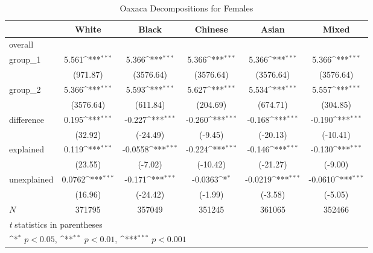 \begin{table}[htbp]\centering
\def\sym#1{\ifmmode^{#1}\else\(^{#1}\)\fi}
\caption{Oaxaca Decompositions for Females\label{tab1}}
\begin{tabular}{l*{5}{c}}
\hline\hline
            &\multicolumn{1}{c}{White}&\multicolumn{1}{c}{Black}&\multicolumn{1}{c}{Chinese}&\multicolumn{1}{c}{Asian}&\multicolumn{1}{c}{Mixed}\\
\hline
overall     &                     &                     &                     &                     &                     \\
group\_1     &       5.561\sym{***}&       5.366\sym{***}&       5.366\sym{***}&       5.366\sym{***}&       5.366\sym{***}\\
            &    (971.87)         &   (3576.64)         &   (3576.64)         &   (3576.64)         &   (3576.64)         \\
group\_2     &       5.366\sym{***}&       5.593\sym{***}&       5.627\sym{***}&       5.534\sym{***}&       5.557\sym{***}\\
            &   (3576.64)         &    (611.84)         &    (204.69)         &    (674.71)         &    (304.85)         \\
difference  &       0.195\sym{***}&      -0.227\sym{***}&      -0.260\sym{***}&      -0.168\sym{***}&      -0.190\sym{***}\\
            &     (32.92)         &    (-24.49)         &     (-9.45)         &    (-20.13)         &    (-10.41)         \\
explained   &       0.119\sym{***}&     -0.0558\sym{***}&      -0.224\sym{***}&      -0.146\sym{***}&      -0.130\sym{***}\\
            &     (23.55)         &     (-7.02)         &    (-10.42)         &    (-21.27)         &     (-9.00)         \\
unexplained &      0.0762\sym{***}&      -0.171\sym{***}&     -0.0363\sym{*}  &     -0.0219\sym{***}&     -0.0610\sym{***}\\
            &     (16.96)         &    (-24.42)         &     (-1.99)         &     (-3.58)         &     (-5.05)         \\
\hline
\(N\)       &      371795         &      357049         &      351245         &      361065         &      352466         \\
\hline\hline
\multicolumn{6}{l}{\footnotesize \textit{t} statistics in parentheses}\\
\multicolumn{6}{l}{\footnotesize \sym{*} \(p<0.05\), \sym{**} \(p<0.01\), \sym{***} \(p<0.001\)}\\
\end{tabular}
\label{tab:oaxaca_female_summary}
\end{table}
